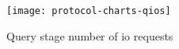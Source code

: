\begin{figure}[h]
	\centering
	\texttt{[image: protocol-charts-qios]}
	\caption{Query stage number of \acrshort{io} requests \cite[Figure 2d]{ore-benchmark-17}}\label{figure:ore}
\end{figure}
